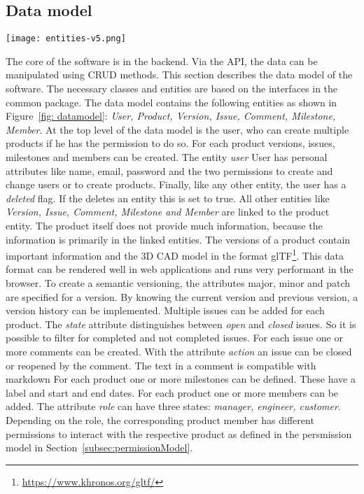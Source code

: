     \subsection*{Data model}

    \begin{figure*}[ht]
        \centering
        \texttt{[image: entities-v5.png]}
        \caption{Data model}
        \label{fig: datamodel}
    \end{figure*}

    The core of the software is in the backend. Via the API, the data can be manipulated using CRUD methods. This section describes the data model of the software. The necessary classes and entities are based on the interfaces in the common package.
    The data model contains the following entities as shown in Figure~\ref{fig: datamodel}: \textit{User, Product, Version, Issue, Comment, Milestone, Member}. At the top level of the data model is the user, who can create multiple products if he has the permission to do so. For each product versions, issues, milestones and members can be created. The entity \textit{user} User has personal attributes like name, email, password and the two permissions to create and change users or to create products. Finally, like any other entity, the user has a \textit{deleted} flag. If the deletes an entity this is set to true. All other entities like \textit{Version, Issue, Comment, Milestone and Member} are linked to the product entity. The product itself does not provide much information, because the information is primarily in the linked entities. The versions of a product contain important information and the 3D CAD model in the format glTF\footnote{\url{https://www.khronos.org/gltf/}}. This data format can be rendered well in web applications and runs very performant in the browser.  To create a semantic versioning, the attributes major, minor and patch are specified for a version. By knowing the current version and previous version, a version history can be implemented. Multiple issues can be added for each product. The \textit{state} attribute distinguishes between \textit{open} and \textit{closed} issues. So it is possible to filter for completed and not completed issues. For each issue one or more comments can be created. With the attribute \textit{action} an issue can be closed or reopened by the comment. The text in a comment is compatible with markdown
    For each product one or more milestones can be defined. These have a label and start and end dates. For each product one or more members can be added. The attribute \textit{role} can have three states: \textit{manager, engineer, customer}. Depending on the role, the corresponding product member has different permissions to interact with the respective product  as defined in the persmission model in Section~\ref{subsec:permissionModel}. 

